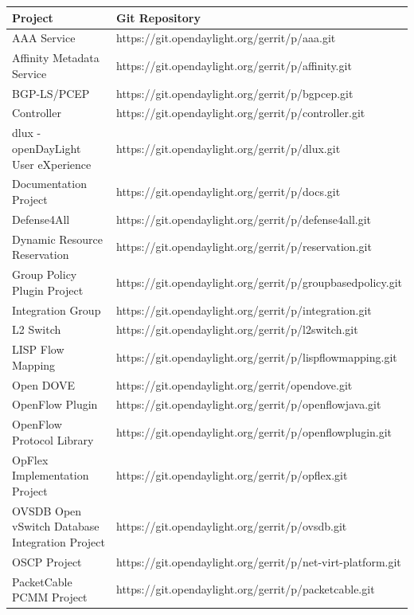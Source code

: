 \documentclass[a4paper, 12pt]{book}
\begin{document}
\begin{table}
\footnotesize
\begin{center}
\begin{tabular}{|p{6cm}|l|}
\hline
\textbf{Project} & \textbf{Git Repository} \\ \hline
AAA Service & https://git.opendaylight.org/gerrit/p/aaa.git \\ \hline
Affinity Metadata Service & https://git.opendaylight.org/gerrit/p/affinity.git \\ \hline
BGP-LS/PCEP & https://git.opendaylight.org/gerrit/p/bgpcep.git \\ \hline
Controller & https://git.opendaylight.org/gerrit/p/controller.git \\ \hline
dlux - openDayLight User eXperience & https://git.opendaylight.org/gerrit/p/dlux.git \\ \hline
Documentation Project & https://git.opendaylight.org/gerrit/p/docs.git \\ \hline
Defense4All & https://git.opendaylight.org/gerrit/p/defense4all.git \\ \hline
Dynamic Resource Reservation  & https://git.opendaylight.org/gerrit/p/reservation.git \\ \hline
Group Policy Plugin Project & https://git.opendaylight.org/gerrit/p/groupbasedpolicy.git \\ \hline
Integration Group & https://git.opendaylight.org/gerrit/p/integration.git \\ \hline
L2 Switch & https://git.opendaylight.org/gerrit/p/l2switch.git \\ \hline
LISP Flow Mapping & https://git.opendaylight.org/gerrit/p/lispflowmapping.git \\ \hline
Open DOVE & https://git.opendaylight.org/gerrit/opendove.git \\ \hline
OpenFlow Plugin & https://git.opendaylight.org/gerrit/p/openflowjava.git \\ \hline
OpenFlow Protocol Library & https://git.opendaylight.org/gerrit/p/openflowplugin.git \\ \hline
OpFlex Implementation Project & https://git.opendaylight.org/gerrit/p/opflex.git \\ \hline
OVSDB Open vSwitch Database Integration Project & https://git.opendaylight.org/gerrit/p/ovsdb.git \\ \hline
OSCP Project & https://git.opendaylight.org/gerrit/p/net-virt-platform.git \\ \hline
PacketCable PCMM Project & https://git.opendaylight.org/gerrit/p/packetcable.git \\ \hline

\end{tabular}
\end{center}
\end{table}
\end{document}
